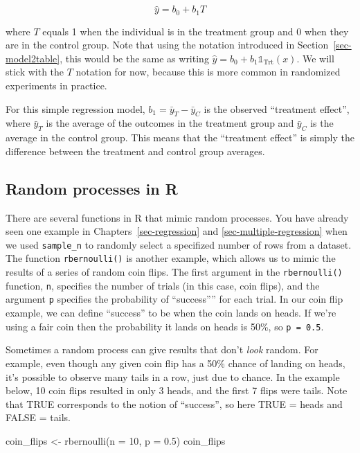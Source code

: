 \documentclass[
  letterpaper,
  DIV=11,
  numbers=noendperiod]{scrreprt}
\newenvironment{Shaded}{\begin{snugshade}}{\end{snugshade}}
\newcommand{\AttributeTok}[1]{\textcolor[rgb]{0.40,0.45,0.13}{#1}}
\newcommand{\DecValTok}[1]{\textcolor[rgb]{0.68,0.00,0.00}{#1}}
\newcommand{\FloatTok}[1]{\textcolor[rgb]{0.68,0.00,0.00}{#1}}
\newcommand{\FunctionTok}[1]{\textcolor[rgb]{0.28,0.35,0.67}{#1}}
\newcommand{\NormalTok}[1]{\textcolor[rgb]{0.00,0.23,0.31}{#1}}
\newcommand{\OtherTok}[1]{\textcolor[rgb]{0.00,0.23,0.31}{#1}}
\theoremstyle{definition}
\theoremstyle{remark}
\begin{document}
\[\hat{y} = b_0 + b_1T \]

where \(T\) equals 1 when the individual is in the treatment group and 0
when they are in the control group. Note that using the notation
introduced in Section~\ref{sec-model2table}, this would be the same as
writing \(\hat{y} = b_0 + b_1\mathbb{1}_{\mbox{Trt}}(x)\). We will stick
with the \(T\) notation for now, because this is more common in
randomized experiments in practice.

For this simple regression model, \(b_1 = \bar{y}_T - \bar{y}_C\) is the
observed ``treatment effect'', where \(\bar{y}_T\) is the average of the
outcomes in the treatment group and \(\bar{y}_C\) is the average in the
control group. This means that the ``treatment effect'' is simply the
difference between the treatment and control group averages.

\hypertarget{random-processes-in-r}{%
\subsection{Random processes in R}\label{random-processes-in-r}}

There are several functions in R that mimic random processes. You have
already seen one example in Chapters~\ref{sec-regression} and
\ref{sec-multiple-regression} when we used \texttt{sample\_n} to
randomly select a specifized number of rows from a dataset. The function
\texttt{rbernoulli()} is another example, which allows us to mimic the
results of a series of random coin flips. The first argument in the
\texttt{rbernoulli()} function, \texttt{n}, specifies the number of
trials (in this case, coin flips), and the argument \texttt{p} specifies
the probability of ``success'''' for each trial. In our coin flip
example, we can define ``success'' to be when the coin lands on heads.
If we're using a fair coin then the probability it lands on heads is
50\%, so \texttt{p\ =\ 0.5}.

Sometimes a random process can give results that don't \emph{look}
random. For example, even though any given coin flip has a 50\% chance
of landing on heads, it's possible to observe many tails in a row, just
due to chance. In the example below, 10 coin flips resulted in only 3
heads, and the first 7 flips were tails. Note that TRUE corresponds to
the notion of ``success'', so here TRUE = heads and FALSE = tails.

\begin{Shaded}
\begin{Highlighting}[]
\NormalTok{coin\_flips }\OtherTok{\textless{}{-}} \FunctionTok{rbernoulli}\NormalTok{(}\AttributeTok{n =} \DecValTok{10}\NormalTok{, }\AttributeTok{p =} \FloatTok{0.5}\NormalTok{)}
\NormalTok{coin\_flips}
\end{Highlighting}
\end{Shaded}
\end{document}
